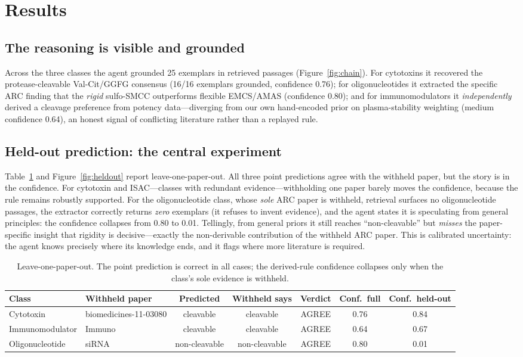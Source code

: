 \documentclass[10pt]{article}
\begin{document}
\section{Results}\subsection{The reasoning is visible and grounded}
Across the three classes the agent grounded 25 exemplars in retrieved passages (Figure~\ref{fig:chain}). For cytotoxins it recovered the protease-cleavable Val-Cit/GGFG consensus (16/16 exemplars grounded, confidence 0.76); for oligonucleotides it extracted the specific ARC finding that the \emph{rigid} sulfo-SMCC outperforms flexible EMCS/AMAS (confidence 0.80); and for immunomodulators it \emph{independently} derived a cleavage preference from potency data---diverging from our own hand-encoded prior on plasma-stability weighting (medium confidence 0.64), an honest signal of conflicting literature rather than a replayed rule.

\subsection{Held-out prediction: the central experiment}
Table~\ref{tab:heldout} and Figure~\ref{fig:heldout} report leave-one-paper-out. All three point predictions agree with the withheld paper, but the story is in the confidence. For cytotoxin and ISAC---classes with redundant evidence---withholding one paper barely moves the confidence, because the rule remains robustly supported. For the oligonucleotide class, whose \emph{sole} ARC paper is withheld, retrieval surfaces no oligonucleotide passages, the extractor correctly returns \emph{zero} exemplars (it refuses to invent evidence), and the agent states it is speculating from general principles: the confidence collapses from 0.80 to 0.01. Tellingly, from general priors it still reaches ``non-cleavable'' but \emph{misses} the paper-specific insight that rigidity is decisive---exactly the non-derivable contribution of the withheld ARC paper. This is calibrated uncertainty: the agent knows precisely where its knowledge ends, and it flags where more literature is required.

\begin{table}[t]\centering\caption{Leave-one-paper-out. The point prediction is correct in all cases; the derived-rule confidence collapses only when the class's sole evidence is withheld.}\label{tab:heldout}\small
\begin{tabular}{l l c c c c c}\toprule
Class & Withheld paper & Predicted & Withheld says & Verdict & Conf.\ full & Conf.\ held-out \\ \midrule
Cytotoxin & biomedicines-11-03080 & cleavable & cleavable & AGREE & 0.76 & 0.84 \\
Immunomodulator & Immuno & cleavable & cleavable & AGREE & 0.64 & 0.67 \\
Oligonucleotide & siRNA & non-cleavable & non-cleavable & AGREE & 0.80 & 0.01 \\
\bottomrule\end{tabular}\end{table}
\end{document}
